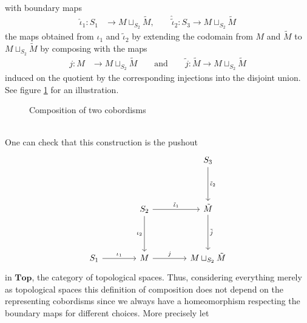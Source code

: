 with boundary maps
\begin{align*}
  \hat{\iota}_{1}
  \colon
  S_{1}
  &\to
  M
  \sqcup_{S_{2}}
  \tilde{M}
  ,\qquad
  \hat{\tilde{\iota}}_{2}
  \colon
  S_{3}
  \to
  M
  \sqcup_{S_{2}}
  \tilde{M}
\end{align*}
the maps obtained from $\iota_{1}$ and $\tilde{\iota}_{2}$ by extending the codomain from $M$ and $\tilde{M}$ to $M \sqcup_{S_{2}} \tilde{M}$ by composing with the maps
\begin{align*}
  j
  \colon
  M
  &\to
  M
  \sqcup_{S_{2}}
  \tilde{M}
  \qquad
  \text{and}
  \qquad
  \tilde{j}
  \colon
  \tilde{M}
  \to
  M
  \sqcup_{S_{2}}
  \tilde{M}
\end{align*}
induced on the quotient by the corresponding injections into the disjoint union. See figure \ref{fig:comp} for an illustration.
\begin{figure}[h!]
\centering
{}
\caption{Composition of two cobordisms}
\label{fig:comp}
\end{figure}
\\
One can check that this construction is the pushout
\begin{equation*}
\begin{tikzcd}[row sep=4em,column sep=4em]
  &
  &
  S_{3}
  \ar{d}{\tilde{\iota}_{2}}
  \\
  &
  S_{2}
  \ar{r}{\tilde{\iota}_{1}}
  \ar[swap]{d}{\iota_{2}}
  &
  \tilde{M}
  \ar{d}{\tilde{j}}
  \\
  S_{1}
  \ar{r}{\iota_{1}}
  &
  M
  \ar{r}{j}
  &
  M
  \sqcup_{S_{2}}
  \tilde{M}
\end{tikzcd}
\end{equation*}
in $\mathbf{Top}$, the category of topological spaces. Thus, considering everything merely as topological spaces this definition of composition does not depend on the representing cobordisms since we always have a homeomorphism respecting the boundary maps for different choices. More precisely let
